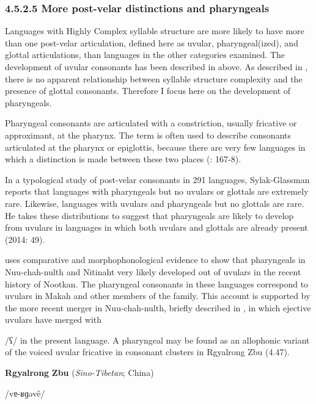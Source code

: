 \subsubsection{\textbf{4.5.2.5} \textbf{More} \textbf{post-velar} \textbf{distinctions} \textbf{and} \textbf{pharyngeals}}

  Languages with Highly Complex syllable structure are more likely to have more than one post-velar articulation, defined here as uvular, pharyngeal(ized), and glottal articulations, than languages in the other categories examined. The development of uvular consonants has been described in  above. As described in , there is no apparent relationship between syllable structure complexity and the presence of glottal consonants. Therefore I focus here on the development of pharyngeals.

  Pharyngeal consonants are articulated with a constriction, usually fricative or approximant, at the pharynx. The term is often used to describe consonants articulated at the pharynx or epiglottis, because there are very few languages in which a distinction is made between these two places (\citealt{LadefogedMaddieson1996}: 167-8).

  In a typological study of post-velar consonants in 291 languages, Sylak-Glassman reports that languages with pharyngeals but no uvulars or glottals are extremely rare. Likewise, languages with uvulars and pharyngeals but no glottals are rare. He takes these distributions to suggest that pharyngeals are likely to develop from uvulars in languages in which both uvulars and glottals are already present (2014: 49).

  \citet{Jacobsen1969} uses comparative and morphophonological evidence to show that pharyngeals in Nuu-chah-nulth and Nitinaht very likely developed out of uvulars in the recent history of Nootkan. The pharyngeal consonants in these languages correspond to uvulars in Makah and other members of the family. This account is supported by the more recent merger in Nuu-chah-nulth, briefly described in , in which ejective uvulars have merged with 

/ʕ/ in the present language. A pharyngeal may be found as an allophonic variant of the voiced uvular fricative in consonant clusters in Rgyalrong Zbu (4.47).

\ea\label{ex:(4.47)}
  \textbf{Rgyalrong} \textbf{Zbu} (\textit{Sino-Tibetan}; China)

/vɐ-ʁɡəvê/

